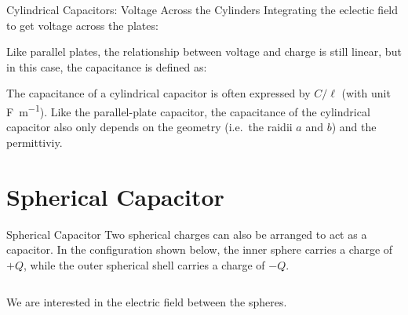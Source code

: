 \documentclass[12pt,aspectratio=169]{beamer}
\begin{document}
\begin{frame}{Cylindrical Capacitors: Voltage Across the Cylinders}
  Integrating the eclectic field to get voltage across the plates:


  Like parallel plates, the relationship between voltage and charge is still
  linear, but in this case, the capacitance is defined as:


  The capacitance of a cylindrical capacitor is often expressed by $C/\ell$
  (with unit \si{\farad\per\metre}). Like the parallel-plate capacitor, the
  capacitance of the cylindrical capacitor also only depends on the geometry
  (i.e.\ the raidii $a$ and $b$) and the permittiviy.
\end{frame}



\section{Spherical Capacitor}

\begin{frame}{Spherical Capacitor}
  Two spherical charges can also be arranged to act as a capacitor. In the
  configuration shown below, the inner sphere carries a charge of $+Q$, while
  the outer spherical shell carries a charge of $-Q$.
  \begin{columns}[T]
    \centering
    
  \end{columns}

  \vspace{.1in}We are interested in the electric field between the spheres.
\end{frame}
\end{document}
